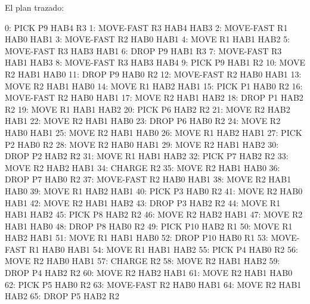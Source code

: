 \documentclass[	DIV=calc,%
							paper=a4,%
							fontsize=11pt]{scrartcl}	 					%
\newcommand{\lispscript}[2]{
    \myLisp[label=#2]{#1}
}
\begin{document}
\lispscript{../p0e4.pddl}{p0e4.pddl}

El plan trazado:

\begin{bashcode}
	        0: PICK P9 HAB4 R3
	        1: MOVE-FAST R3 HAB4 HAB3
	        2: MOVE-FAST R1 HAB0 HAB1
	        3: MOVE-FAST R2 HAB0 HAB1
	        4: MOVE R1 HAB1 HAB2
	        5: MOVE-FAST R3 HAB3 HAB1
	        6: DROP P9 HAB1 R3
	        7: MOVE-FAST R3 HAB1 HAB3
	        8: MOVE-FAST R3 HAB3 HAB4
	        9: PICK P9 HAB1 R2
	       10: MOVE R2 HAB1 HAB0
	       11: DROP P9 HAB0 R2
	       12: MOVE-FAST R2 HAB0 HAB1
	       13: MOVE R2 HAB1 HAB0
	       14: MOVE R1 HAB2 HAB1
	       15: PICK P1 HAB0 R2
	       16: MOVE-FAST R2 HAB0 HAB1
	       17: MOVE R2 HAB1 HAB2
	       18: DROP P1 HAB2 R2
	       19: MOVE R1 HAB1 HAB2
	       20: PICK P6 HAB2 R2
	       21: MOVE R2 HAB2 HAB1
	       22: MOVE R2 HAB1 HAB0
	       23: DROP P6 HAB0 R2
	       24: MOVE R2 HAB0 HAB1
	       25: MOVE R2 HAB1 HAB0
	       26: MOVE R1 HAB2 HAB1
	       27: PICK P2 HAB0 R2
	       28: MOVE R2 HAB0 HAB1
	       29: MOVE R2 HAB1 HAB2
	       30: DROP P2 HAB2 R2
	       31: MOVE R1 HAB1 HAB2
	       32: PICK P7 HAB2 R2
	       33: MOVE R2 HAB2 HAB1
	       34: CHARGE R2
	       35: MOVE R2 HAB1 HAB0
	       36: DROP P7 HAB0 R2
	       37: MOVE-FAST R2 HAB0 HAB1
	       38: MOVE R2 HAB1 HAB0
	       39: MOVE R1 HAB2 HAB1
	       40: PICK P3 HAB0 R2
	       41: MOVE R2 HAB0 HAB1
	       42: MOVE R2 HAB1 HAB2
	       43: DROP P3 HAB2 R2
	       44: MOVE R1 HAB1 HAB2
	       45: PICK P8 HAB2 R2
	       46: MOVE R2 HAB2 HAB1
	       47: MOVE R2 HAB1 HAB0
	       48: DROP P8 HAB0 R2
	       49: PICK P10 HAB2 R1
	       50: MOVE R1 HAB2 HAB1
	       51: MOVE R1 HAB1 HAB0
	       52: DROP P10 HAB0 R1
	       53: MOVE-FAST R1 HAB0 HAB1
	       54: MOVE R1 HAB1 HAB2
	       55: PICK P4 HAB0 R2
	       56: MOVE R2 HAB0 HAB1
	       57: CHARGE R2
	       58: MOVE R2 HAB1 HAB2
	       59: DROP P4 HAB2 R2
	       60: MOVE R2 HAB2 HAB1
	       61: MOVE R2 HAB1 HAB0
	       62: PICK P5 HAB0 R2
	       63: MOVE-FAST R2 HAB0 HAB1
	       64: MOVE R2 HAB1 HAB2
	       65: DROP P5 HAB2 R2

\end{bashcode}
\end{document}
